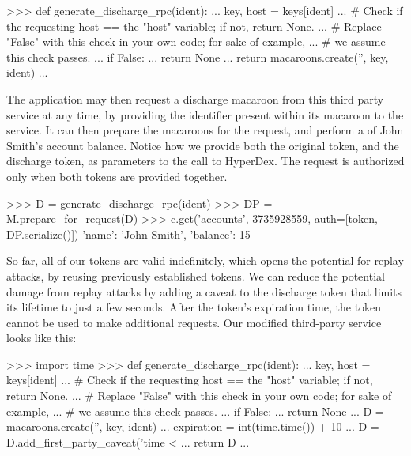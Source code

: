 \begin{pythoncode}
>>> def generate_discharge_rpc(ident):
...     key, host = keys[ident]
...     # Check if the requesting host == the "host" variable; if not, return None.
...     # Replace "False" with this check in your own code; for sake of example,
...     # we assume this check passes.
...     if False:
...         return None
...     return macaroons.create('', key, ident)
...
\end{pythoncode}

The application may then request a discharge macaroon from this third party
service at any time, by providing the identifier present within its macaroon to
the service.  It can then prepare the macaroons for the request, and perform a
 of John Smith's account balance.  Notice how we provide both the
original token, and the discharge token, as parameters to the call to HyperDex.
The request is authorized only when both tokens are provided together.

\begin{pythoncode}
>>> D = generate_discharge_rpc(ident)
>>> DP = M.prepare_for_request(D)
>>> c.get('accounts', 3735928559, auth=[token, DP.serialize()])
{'name': 'John Smith', 'balance': 15}
\end{pythoncode}

So far, all of our tokens are valid indefinitely, which opens the potential for
replay attacks, by reusing previously established tokens.  We can reduce the
potential damage from replay attacks by adding a caveat to the discharge token
that limits its lifetime to just a few seconds.  After the token's expiration
time, the token cannot be used to make additional requests.  Our modified
third-party service looks like this:

\begin{pythoncode}
>>> import time
>>> def generate_discharge_rpc(ident):
...     key, host = keys[ident]
...     # Check if the requesting host == the "host" variable; if not, return None.
...     # Replace "False" with this check in your own code; for sake of example,
...     # we assume this check passes.
...     if False:
...         return None
...     D = macaroons.create('', key, ident)
...     expiration = int(time.time()) + 10
...     D = D.add_first_party_caveat('time < %
...     return D
...
\end{pythoncode}

